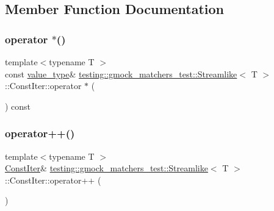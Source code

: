 \subsection{Member Function Documentation}
\mbox{\label{classtesting_1_1gmock__matchers__test_1_1_streamlike_1_1_const_iter_ae9883d3a3cc1d424a1d5251f88f0e854}} 
\subsubsection{\texorpdfstring{operator $\ast$()}{operator *()}}
{\footnotesize\ttfamily template$<$typename T $>$ \\
const \mbox{\hyperlink{classtesting_1_1gmock__matchers__test_1_1_streamlike_a7e2c2e021676c1ed5dea63cdd019661c}{value\+\_\+type}}\& \mbox{\hyperlink{classtesting_1_1gmock__matchers__test_1_1_streamlike}{testing\+::gmock\+\_\+matchers\+\_\+test\+::\+Streamlike}}$<$ T $>$\+::Const\+Iter\+::operator $\ast$ (\begin{DoxyParamCaption}{ }\end{DoxyParamCaption}) const\hspace{0.3cm}{\ttfamily [inline]}}

\mbox{\label{classtesting_1_1gmock__matchers__test_1_1_streamlike_1_1_const_iter_a9bcafc679a4e5bf63060bcee69a983f9}} 
\subsubsection{\texorpdfstring{operator++()}{operator++()}\hspace{0.1cm}{\footnotesize\ttfamily [1/2]}}
{\footnotesize\ttfamily template$<$typename T $>$ \\
\mbox{\hyperlink{classtesting_1_1gmock__matchers__test_1_1_streamlike_1_1_const_iter}{Const\+Iter}}\& \mbox{\hyperlink{classtesting_1_1gmock__matchers__test_1_1_streamlike}{testing\+::gmock\+\_\+matchers\+\_\+test\+::\+Streamlike}}$<$ T $>$\+::Const\+Iter\+::operator++ (\begin{DoxyParamCaption}{ }\end{DoxyParamCaption})\hspace{0.3cm}{\ttfamily [inline]}}

